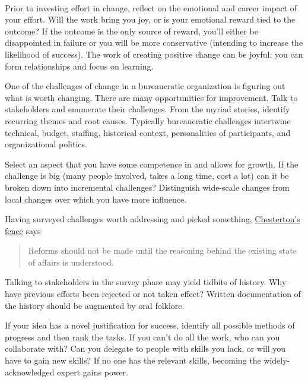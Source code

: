 \ \\

Prior to investing effort in change, reflect on the emotional and career impact of your effort. Will the work bring you joy, or is your emotional reward tied to the outcome? If the outcome is the only source of reward, you'll either be disappointed in failure or you will be more conservative (intending to increase the likelihood of success). The work of creating positive change can be joyful: you can form relationships and focus on learning. 

One of the challenges of change in a bureaucratic organization is figuring out what is worth changing. There are many opportunities for improvement. Talk to stakeholders and enumerate their challenges.
From the myriad stories, identify recurring themes and root causes. Typically bureaucratic challenges intertwine technical, budget, staffing, historical context, personalities of participants, and organizational politics. 

Select an aspect that you have some competence in and allows for growth. If the challenge is big (many people involved, takes a long time, cost a lot) can it be broken down into incremental challenges? Distinguish wide-scale changes from local changes over which you have more influence.

Having surveyed challenges worth addressing and picked something, 
\href{https://en.wikipedia.org/wiki/Wikipedia:Chesterton\%27s_fence}{Chesterton's fence} says
\begin{quote}
Reforms should not be made until the reasoning behind the existing state of affairs is understood.
\end{quote}
Talking to stakeholders in the survey phase may yield tidbits of history. Why have previous efforts been rejected or not taken effect? Written documentation of the history should be augmented by oral folklore. 

If your idea has a novel justification for success, identify all possible methods of progress and then rank the tasks. If you can't do all the work, who can you collaborate with? Can you delegate to people with skills you lack, or will you have to gain new skills? 
If no one has the relevant skills, becoming the widely-acknowledged expert gains power. 



